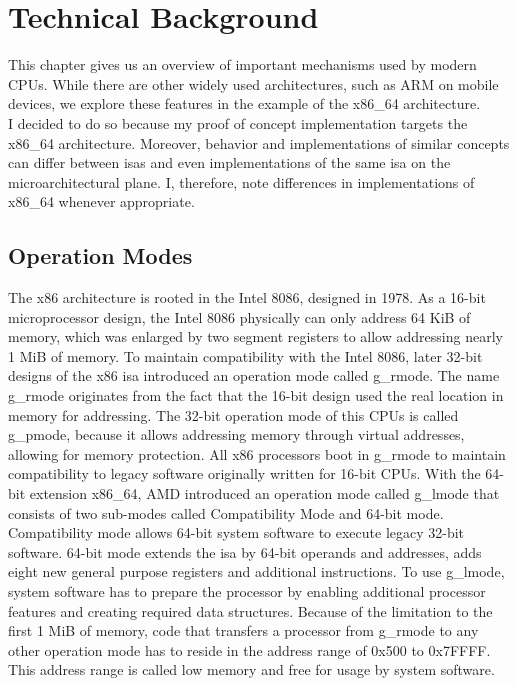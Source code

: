 \section{Technical Background}
\label{sec:state:technical}
This chapter gives us an overview of important mechanisms used by modern CPUs.
While there are other widely used architectures, such as ARM on mobile devices,
we explore these features in the example of the x86\_64 architecture. \\

I decided to do so because my proof of concept implementation targets the
x86\_64 architecture. Moreover, behavior and implementations of similar concepts
can differ between \glspl{isa} and even implementations of the
same \gls{isa} on the microarchitectural plane. I, therefore, note
differences in implementations of x86\_64 whenever appropriate.

\subsection{Operation Modes}
\label{sec:state:technical:modes}
The x86 architecture is rooted in the Intel 8086, designed in 1978. As a 16-bit
microprocessor design, the Intel 8086 physically can only address 64 KiB of
memory, which was enlarged by two segment registers to allow addressing nearly 1
MiB of memory. To maintain compatibility with the Intel 8086, later 32-bit
designs of the x86 \gls{isa} introduced an operation mode called \gls{g_rmode}.
The name \gls{g_rmode} originates from the fact that the 16-bit design used the
real location in memory for addressing. The 32-bit operation mode of this CPUs
is called \gls{g_pmode}, because it allows addressing memory through virtual
addresses, allowing for memory protection. All x86 processors boot in
\gls{g_rmode} to maintain compatibility to legacy software originally written
for 16-bit CPUs. With the 64-bit extension x86\_64, AMD introduced an operation
mode called \gls{g_lmode} that consists of two sub-modes called Compatibility
Mode and 64-bit mode. Compatibility mode allows 64-bit system software to
execute legacy 32-bit software. 64-bit mode extends the \gls{isa} by 64-bit
operands and addresses, adds eight new general purpose registers and additional
instructions. To use \gls{g_lmode}, system software has to prepare the processor
by enabling additional processor features and creating required data structures.
Because of the limitation to the first 1 MiB of memory, code that transfers a
processor from \gls{g_rmode} to any other operation mode has to reside in the
address range of 0x500 to 0x7FFFF. This address range is called low memory and
free for usage by system software.

